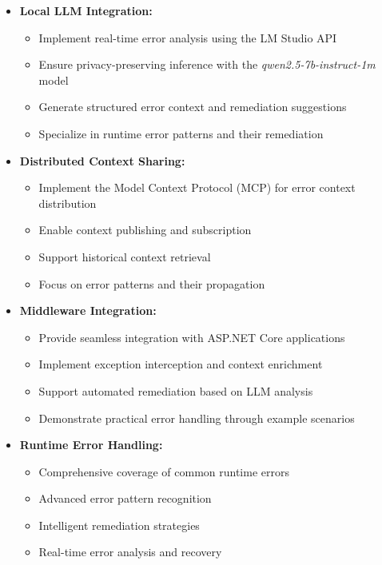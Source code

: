\begin{itemize}
    \item \textbf{Local LLM Integration:}
    \begin{itemize}
        \item Implement real-time error analysis using the LM Studio API
        \item Ensure privacy-preserving inference with the \textit{qwen2.5-7b-instruct-1m} model
        \item Generate structured error context and remediation suggestions
        \item Specialize in runtime error patterns and their remediation
    \end{itemize}
    \item \textbf{Distributed Context Sharing:}
    \begin{itemize}
        \item Implement the Model Context Protocol (MCP) for error context distribution
        \item Enable context publishing and subscription
        \item Support historical context retrieval
        \item Focus on error patterns and their propagation
    \end{itemize}
    \item \textbf{Middleware Integration:}
    \begin{itemize}
        \item Provide seamless integration with ASP.NET Core applications
        \item Implement exception interception and context enrichment
        \item Support automated remediation based on LLM analysis
        \item Demonstrate practical error handling through example scenarios
    \end{itemize}
    \item \textbf{Runtime Error Handling:}
    \begin{itemize}
        \item Comprehensive coverage of common runtime errors
        \item Advanced error pattern recognition
        \item Intelligent remediation strategies
        \item Real-time error analysis and recovery
    \end{itemize}
\end{itemize}


